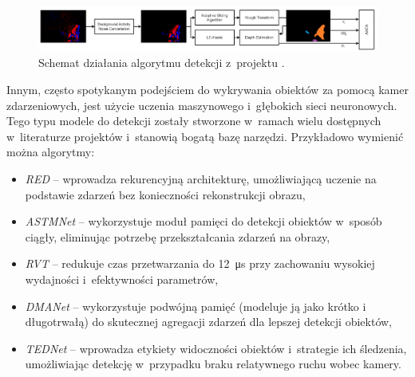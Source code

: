 \begin{figure}
    \centering
    \includegraphics[width=1\linewidth]{images/overview_night_obstacle.png}
    \caption{Schemat działania algorytmu detekcji z~projektu \cite{night_obstacle}.}
    \label{fig:night_overview}
\end{figure}
    










Innym, często spotykanym podejściem do wykrywania obiektów za pomocą kamer zdarzeniowych, jest użycie uczenia maszynowego i~głębokich sieci neuronowych. Tego typu modele do detekcji zostały stworzone w~ramach wielu dostępnych w~literaturze projektów i~stanowią bogatą bazę narzędzi. Przykładowo wymienić można algorytmy:
\begin{itemize}
    \item \textit{RED} \cite{RED} -- wprowadza rekurencyjną architekturę, umożliwiającą uczenie na podstawie zdarzeń bez konieczności rekonstrukcji obrazu,
    \item \textit{ASTMNet} \cite{ASTMNet} -- wykorzystuje moduł pamięci do detekcji obiektów w~sposób ciągły, eliminując potrzebę przekształcania zdarzeń na obrazy,
    \item \textit{RVT} \cite{RVT} -- redukuje czas przetwarzania do \SI{12}{\micro\s} przy zachowaniu wysokiej wydajności i~efektywności parametrów,
    \item \textit{DMANet} \cite{DMANet} -- wykorzystuje podwójną pamięć (modeluje ją jako krótko i długotrwałą) do skutecznej agregacji zdarzeń dla lepszej detekcji obiektów,
    \item \textit{TEDNet} \cite{TEDNet} -- wprowadza etykiety widoczności obiektów i~strategie ich śledzenia, umożliwiając detekcję w~przypadku braku relatywnego ruchu wobec kamery.
\end{itemize}

